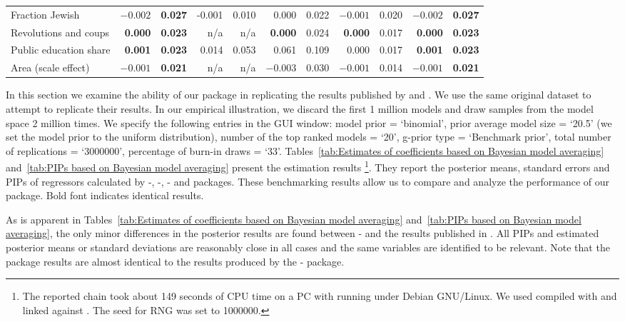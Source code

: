 \begin{table}
\begin{tabular}{lrrrrrrrrrr}
		Fraction Jewish  	  &$\mathbf{-0.002}$&\textbf{0.027}&-0.001	 &0.010	&0.000	&0.022 &$-0.001$& 0.020&$\mathbf{-0.002}$&\textbf{0.027}\\
		Revolutions and coups &\textbf{0.000} &\textbf{0.023}&n/a	 &n/a	&\textbf{0.000}&0.024 &\textbf{0.000}	& 0.017&\textbf{0.000} &\textbf{0.023}\\
		Public education share&\textbf{0.001} &\textbf{0.023}&0.014	 &0.053	&0.061	&0.109 &0.000	& 0.017&\textbf{0.001} &\textbf{0.023}\\
		Area (scale effect)   &$\mathbf{-0.001}$&\textbf{0.021}&n/a	 &n/a	&$-0.003$&0.030 &$\mathbf{-0.001}$&0.014 &$\mathbf{-0.001}$&\textbf{0.021}\\\hline
	\end{tabular}
	\label{tab:Estimates of coefficients based on Bayesian model averaging}
\end{table}


In this section we examine the ability of our package in replicating
the results published by \cite{FernandezLeySteel2001b} and
\cite{LeySteel2007}.  We use the same original dataset to attempt to
replicate their results. In our empirical illustration, we discard the
first 1 million models and draw samples from the model space 2 million
times. We specify the following entries in the GUI  window: model
prior = `binomial', prior average model size = `20.5' (we set the
model prior to the uniform distribution), number of the top ranked
models = `20', g-prior type = `Benchmark prior', total number of
replications = `3000000', percentage of burn-in draws = `33'.
Tables~\ref{tab:Estimates of coefficients based on Bayesian model
	averaging} and~\ref{tab:PIPs based on Bayesian model averaging}
present the estimation results%
\footnote{The reported chain took about 149 seconds of CPU time on a PC
	with {\machine} running under Debian
	GNU/Linux. We used  {\gretlver} compiled with {\compiler}
	and linked against \blas. The seed for RNG was set to 1000000.}.
They report the posterior means, 
standard errors and PIPs of regressors calculated by -,
-, - and  packages. These
benchmarking results allow us to compare and analyze the performance
of our package. Bold font indicates identical results.

As is apparent in Tables~\ref{tab:Estimates of coefficients based on
	Bayesian model averaging} and~\ref{tab:PIPs based on Bayesian model
	averaging}, the only minor differences in the posterior results are
found between - and the results published in
\cite{LeySteel2007}.  All PIPs and estimated posterior means or
standard deviations are reasonably close in all cases and the same
variables are identified to be relevant. Note that the  package
results are almost identical to the results produced by the
- package.

